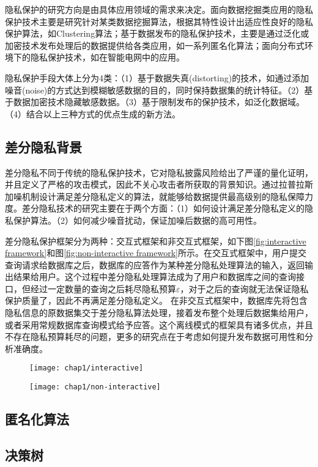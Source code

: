 隐私保护的研究方向是由具体应用领域的需求来决定。面向数据挖掘类应用的隐私保护技术主要是研究针对某类数据挖掘算法，根据其特性设计出适应性良好的隐私保护算法，如Clustering\cite{clustering}算法；基于数据发布的隐私保护技术，主要是通过泛化或加密技术发布处理后的数据提供给各类应用，如一系列匿名化算法\cite{multidimensional k anonymity}；面向分布式环境下的隐私保护技术，如在智能电网中的应用\cite{Distributed Privacy}。

隐私保护手段大体上分为4类\cite{面向数据库应用的隐私保护研究综述}：（1）基于数据失真(distorting)的技术，如通过添加噪音(noise)的方式达到模糊敏感数据的目的，同时保持数据集的统计特征。（2）基于数据加密技术隐藏敏感数据。（3）基于限制发布的保护技术，如泛化数据域。（4）结合以上三种方式的优点生成的新方法。


\subsection{差分隐私背景} %

差分隐私不同于传统的隐私保护技术，它对隐私披露风险给出了严谨的量化证明，并且定义了严格的攻击模式，因此不关心攻击者所获取的背景知识。通过拉普拉斯加噪机制\cite{Dwork Calibrating}设计满足差分隐私定义的算法，就能够给数据提供最高级别的隐私保障力度。差分隐私技术的研究主要在于两个方面：（1）如何设计满足差分隐私定义的隐私保护算法。（2）如何减少噪音扰动，保证加噪后数据的高可用性。

差分隐私保护框架分为两种：交互式框架和非交互式框架，如下图\ref{fig:interactive framework}和图\ref{fig:non-interactive framework}所示。在交互式框架中，用户提交查询请求给数据库之后，数据库的应答作为某种差分隐私处理算法的输入，返回输出结果给用户。这个过程中差分隐私处理算法成为了用户和数据库之间的查询接口，但经过一定数量的查询之后耗尽隐私预算$\varepsilon$，对于之后的查询就无法保证隐私保护质量了，因此不再满足差分隐私定义。
在非交互式框架中，数据库先将包含隐私信息的原数据集交于差分隐私算法处理，接着发布整个处理后数据集给用户，或者采用常规数据库查询模式给予应答。这个离线模式的框架具有诸多优点，并且不存在隐私预算耗尽的问题，更多的研究点在于考虑如何提升发布数据可用性和分析准确度。

\begin{figure}[!htp]
	\centering
	\texttt{[image: chap1/interactive]}
\end{figure}

\begin{figure}[!htp]
	\centering
	\texttt{[image: chap1/non-interactive]}
\end{figure}



\subsection{匿名化算法}  %

\subsection{决策树} %


